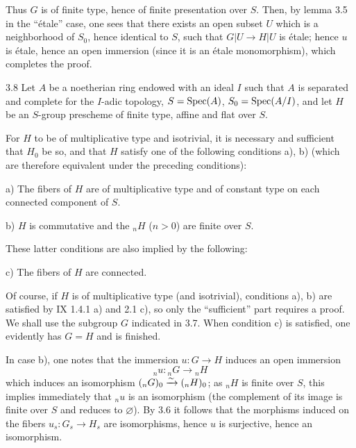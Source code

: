 Thus $G$ is of finite type, hence of finite presentation over $S$. Then, by lemma 3.5 in the ``étale'' case, one sees that there exists an open subset $U$ which is a neighborhood of $S_0$, hence identical to $S$, such that $G|U\to H|U$ is étale; hence $u$ is étale, hence an open immersion (since it is an étale monomorphism), which completes the proof.
\begin{corollary}{3.8}\label{X.3.8}
Let $A$ be a noetherian ring endowed with an ideal $I$ such that $A$ is separated and complete for the $I$-adic topology, $S=\operatorname{Spec}(A)$, $S_0=\operatorname{Spec}(A/I)$, and let $H$ be an $S$-group prescheme of finite type, affine and flat over $S$.

For $H$ to be of multiplicative type and isotrivial, it is necessary and sufficient that $H_0$ be so, and that $H$ satisfy one of the following conditions a), b) (which are therefore equivalent under the preceding conditions):

a) The fibers of $H$ are of multiplicative type and of constant type on each connected component of $S$.

b) $H$ is commutative and the ${}_nH$ ($n>0$) are finite over $S$.

These latter conditions are also implied by the following:

c) The fibers of $H$ are connected.
\end{corollary}
Of course, if $H$ is of multiplicative type (and isotrivial), conditions a), b) are satisfied by IX 1.4.1 a) and 2.1 c), so only the ``sufficient'' part requires a proof. We shall use the subgroup $G$ indicated in 3.7. When condition c) is satisfied, one evidently has $G=H$ and is finished.

In case b), one notes that the immersion $u:G\to H$ induces an open immersion
\[
{}_nu:{}_nG\to{}_nH
\]
which induces an isomorphism $({}_nG)_0\xrightarrow{\sim}({}_nH)_0$; as ${}_nH$ is finite over $S$, this implies immediately that ${}_nu$ is an isomorphism (the complement of its image is finite over $S$ and reduces to $\varnothing$). By 3.6 it follows that the morphisms induced on the fibers $u_s:G_s\to H_s$ are isomorphisms, hence $u$ is surjective, hence an isomorphism.

